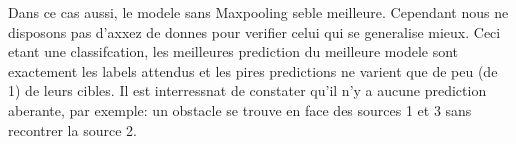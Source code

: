 Dans ce cas aussi, le modele sans Maxpooling seble meilleure. Cependant nous ne disposons pas d'axxez de donnes pour verifier celui qui se generalise mieux. Ceci etant une classifcation,  les meilleures prediction du meilleure modele sont exactement les labels attendus et les pires predictions ne varient que de peu (de 1) de leurs cibles. Il est interressnat de constater qu'il n'y a aucune prediction aberante, par exemple: un obstacle se trouve en face des sources 1 et 3 sans recontrer la source 2.


